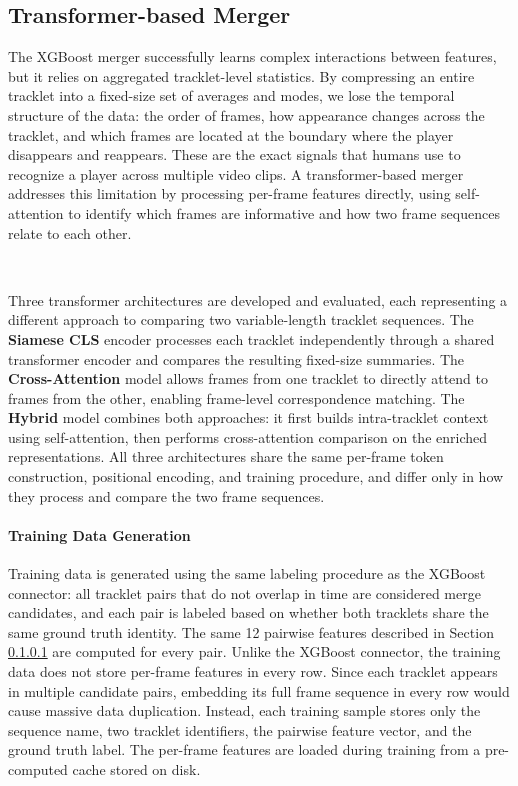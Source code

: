\subsection{Transformer-based Merger}
The XGBoost merger successfully learns complex interactions between features, but it relies on aggregated tracklet-level statistics. By compressing an entire tracklet into a fixed-size set of averages and modes, we lose the temporal structure of the data: the order of frames, how appearance changes across the tracklet, and which frames are located at the boundary where the player disappears and reappears. These are the exact signals that humans use to recognize a player across multiple video clips. A transformer-based merger addresses this limitation by processing per-frame features directly, using self-attention to identify which frames are informative and how two frame sequences relate to each other.

\

Three transformer architectures are developed and evaluated, each representing a different approach to comparing two variable-length tracklet sequences. The \textbf{Siamese CLS} encoder processes each tracklet independently through a shared transformer encoder and compares the resulting fixed-size summaries. The \textbf{Cross-Attention} model allows frames from one tracklet to directly attend to frames from the other, enabling frame-level correspondence matching. The \textbf{Hybrid} model combines both approaches: it first builds intra-tracklet context using self-attention, then performs cross-attention comparison on the enriched representations. All three architectures share the same per-frame token construction, positional encoding, and training procedure, and differ only in how they process and compare the two frame sequences.


\paragraph{Training Data Generation}
Training data is generated using the same labeling procedure as the XGBoost connector: all tracklet pairs that do not overlap in time are considered merge candidates, and each pair is labeled based on whether both tracklets share the same ground truth identity. The same 12 pairwise features described in Section \ref{} are computed for every pair. Unlike the XGBoost connector, the training data does not store per-frame features in every row. Since each tracklet appears in multiple candidate pairs, embedding its full frame sequence in every row would cause massive data duplication. Instead, each training sample stores only the sequence name, two tracklet identifiers, the pairwise feature vector, and the ground truth label. The per-frame features are loaded during training from a pre-computed cache stored on disk.

